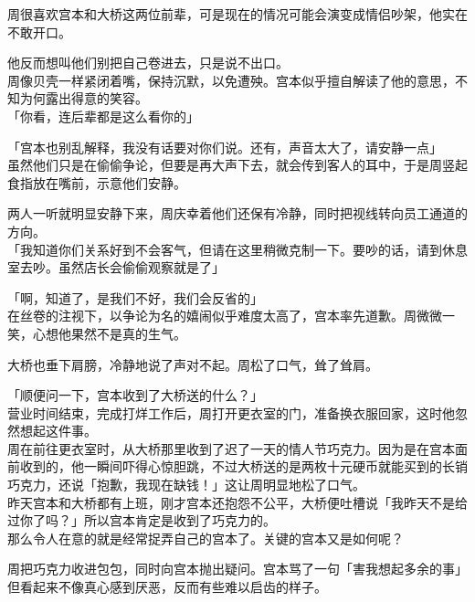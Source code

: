 周很喜欢宫本和大桥这两位前辈，可是现在的情况可能会演变成情侣吵架，他实在不敢开口。

他反而想叫他们别把自己卷进去，只是说不出口。\\

周像贝壳一样紧闭着嘴，保持沉默，以免遭殃。宫本似乎擅自解读了他的意思，不知为何露出得意的笑容。\\

「你看，连后辈都是这么看你的」

「宫本也别乱解释，我没有话要对你们说。还有，声音太大了，请安静一点」\\

虽然他们只是在偷偷争论，但要是再大声下去，就会传到客人的耳中，于是周竖起食指放在嘴前，示意他们安静。

两人一听就明显安静下来，周庆幸着他们还保有冷静，同时把视线转向员工通道的方向。\\

「我知道你们关系好到不会客气，但请在这里稍微克制一下。要吵的话，请到休息室去吵。虽然店长会偷偷观察就是了」

「啊，知道了，是我们不好，我们会反省的」\\

在丝卷的注视下，以争论为名的嬉闹似乎难度太高了，宫本率先道歉。周微微一笑，心想他果然不是真的生气。

大桥也垂下肩膀，冷静地说了声对不起。周松了口气，耸了耸肩。\\

\vspace{2\baselineskip}

「顺便问一下，宫本收到了大桥送的什么？」\\

营业时间结束，完成打烊工作后，周打开更衣室的门，准备换衣服回家，这时他忽然想起这件事。\\

周在前往更衣室时，从大桥那里收到了迟了一天的情人节巧克力。因为是在宫本面前收到的，他一瞬间吓得心惊胆跳，不过大桥送的是两枚十元硬币就能买到的长销巧克力，还说「抱歉，我现在缺钱！」这让周明显地松了口气。\\

昨天宫本和大桥都有上班，刚才宫本还抱怨不公平，大桥便吐槽说「我昨天不是给过你了吗？」所以宫本肯定是收到了巧克力的。\\

那么令人在意的就是经常捉弄自己的宫本了。关键的宫本又是如何呢？

周把巧克力收进包包，同时向宫本抛出疑问。宫本骂了一句「害我想起多余的事」但看起来不像真心感到厌恶，反而有些难以启齿的样子。\\

